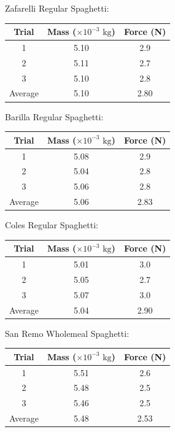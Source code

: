\documentclass[a4paper,11pt]{article}
\begin{document}
Zafarelli Regular Spaghetti:

\begin{center}
\begin{tabular}{|c|c|c|}
\hline
Trial & Mass ($\times 10^{-3}\mbox{ kg}$) & Force (N) \\
\hline
1       & 5.10 & 2.9 \\
2       & 5.11 & 2.7 \\
3       & 5.10 & 2.8 \\
\hline
Average & 5.10 & 2.80 \\
\hline
\end{tabular}
\end{center}

Barilla Regular Spaghetti:

\begin{center}
\begin{tabular}{|c|c|c|}
\hline
Trial & Mass ($\times 10^{-3}\mbox{ kg}$) & Force (N) \\
\hline
1       & 5.08 & 2.9 \\
2       & 5.04 & 2.8 \\
3       & 5.06 & 2.8 \\
\hline
Average & 5.06 & 2.83 \\
\hline
\end{tabular}
\end{center}

Coles Regular Spaghetti:

\begin{center}
\begin{tabular}{|c|c|c|}
\hline
Trial & Mass ($\times 10^{-3}\mbox{ kg}$) & Force (N) \\
\hline
1       & 5.01 & 3.0 \\
2       & 5.05 & 2.7 \\
3       & 5.07 & 3.0 \\
\hline
Average & 5.04 & 2.90 \\
\hline
\end{tabular}
\end{center}

San Remo Wholemeal Spaghetti:

\begin{center}
\begin{tabular}{|c|c|c|}
\hline
Trial & Mass ($\times 10^{-3}\mbox{ kg}$) & Force (N) \\
\hline
1       & 5.51 & 2.6 \\
2       & 5.48 & 2.5 \\
3       & 5.46 & 2.5 \\
\hline
Average & 5.48 & 2.53 \\
\hline
\end{tabular}
\end{center}
\end{document}
